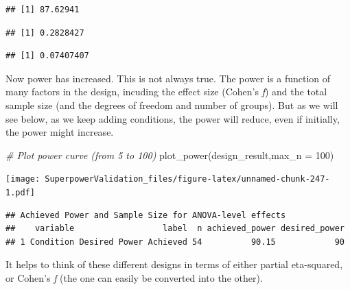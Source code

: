 \documentclass[
]{book}
\newenvironment{Shaded}{\begin{snugshade}}{\end{snugshade}}
\newcommand{\AttributeTok}[1]{\textcolor[rgb]{0.77,0.63,0.00}{#1}}
\newcommand{\CommentTok}[1]{\textcolor[rgb]{0.56,0.35,0.01}{\textit{#1}}}
\newcommand{\DecValTok}[1]{\textcolor[rgb]{0.00,0.00,0.81}{#1}}
\newcommand{\FunctionTok}[1]{\textcolor[rgb]{0.00,0.00,0.00}{#1}}
\newcommand{\NormalTok}[1]{#1}
\newcommand{\SpecialCharTok}[1]{\textcolor[rgb]{0.00,0.00,0.00}{#1}}
\begin{document}
\begin{verbatim}
## [1] 87.62941
\end{verbatim}

\begin{Shaded}
\end{Shaded}

\begin{verbatim}
## [1] 0.2828427
\end{verbatim}

\begin{Shaded}
\end{Shaded}

\begin{verbatim}
## [1] 0.07407407
\end{verbatim}

Now power has increased. This is not always true. The power is a function of many factors in the design, incuding the effect size (Cohen's \emph{f}) and the total sample size (and the degrees of freedom and number of groups). But as we will see below, as we keep adding conditions, the power will reduce, even if initially, the power might increase.

\begin{Shaded}
\begin{Highlighting}[]
\CommentTok{\# Plot power curve (from 5 to 100)}
\FunctionTok{plot\_power}\NormalTok{(design\_result,}\AttributeTok{max\_n =} \DecValTok{100}\NormalTok{)}
\end{Highlighting}
\end{Shaded}

\texttt{[image: SuperpowerValidation\_files/figure-latex/unnamed-chunk-247-1.pdf]}

\begin{verbatim}
## Achieved Power and Sample Size for ANOVA-level effects
##    variable                  label  n achieved_power desired_power
## 1 Condition Desired Power Achieved 54          90.15            90
\end{verbatim}

It helps to think of these different designs in terms of either partial eta-squared, or Cohen's \emph{f} (the one can easily be converted into the other).
\end{document}
